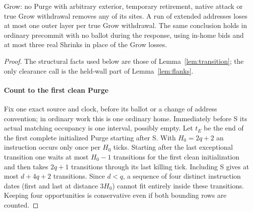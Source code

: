 \begin{lemma}
Grow: no Purge with arbitrary exterior, temporary retirement, native attack or true Grow withdrawal removes any of its sites. A run of extended addresses loses at most one outer layer per true Grow withdrawal. The same conclusion holds in ordinary precommit with no ballot during the response, using in-home bids and at most three real Shrinks in place of the Grow losses.
\end{lemma}
\begin{proof}
The structural facts used below are those of Lemma~\ref{lem:transition}; the only clearance call is the held-wall part of Lemma~\ref{lem:flanks}.

\paragraph{Count to the first clean Purge}
Fix one exact source and clock, before its ballot or a change of address convention; in ordinary work this is one ordinary home. Immediately before S its actual matching occupancy is one interval, possibly empty. Let \(t_E\) be the end of the first complete initialized Purge starting after S. With \(H_0=2q+2\) an instruction occurs only once per \(H_0\) ticks. Starting after the last exceptional transition one waits at most \(H_0- 1\) transitions for the first clean initialization and then takes \(2q+1\) transitions through its last killing tick. Including S gives at most \(d+4q+2\) transitions. Since \(d<q\), a sequence of four distinct instruction dates (first and last at distance \(3H_0\)) cannot fit entirely inside these transitions. Keeping four opportunities is conservative even if both bounding rows are counted.


\end{proof}
